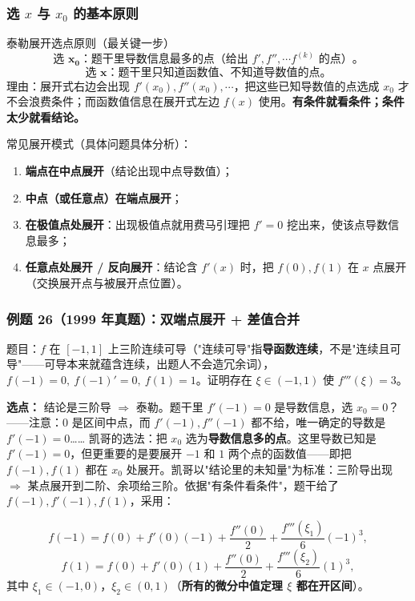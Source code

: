 \documentclass[a4paper]{article}
\begin{document}
\subsubsection{选 $x$ 与 $x_0$ 的基本原则}

\begin{importantbox}{泰勒展开选点原则（最关键一步）}
\[
\text{选 }\boldsymbol{x_0}\text{：题干里}\textbf{导数信息最多}\text{的点（给出 }f',f'',\cdots f^{(k)}\text{ 的点）}。
\]
\[
\text{选 }\boldsymbol{x}\text{：题干里}\textbf{只知道函数值、不知道导数值}\text{的点}。
\]
理由：展开式右边会出现 $f'(x_0),f''(x_0),\cdots$，把这些已知导数值的点选成 $x_0$ 才不会浪费条件；而函数值信息在展开式左边 $f(x)$ 使用。\textbf{有条件就看条件；条件太少就看结论。}
\end{importantbox}

常见展开模式（具体问题具体分析）：
\begin{enumerate}
\item \textbf{端点在中点展开}（结论出现中点导数值）；
\item \textbf{中点（或任意点）在端点展开}；
\item \textbf{在极值点处展开}：出现极值点就用费马引理把 $f'=0$ 挖出来，使该点导数信息最多；
\item \textbf{任意点处展开 / 反向展开}：结论含 $f'(x)$ 时，把 $f(0),f(1)$ 在 $x$ 点展开（交换展开点与被展开点位置）。
\end{enumerate}

\subsubsection{例题 26（1999 年真题）：双端点展开 + 差值合并}

题目：$f$ 在 $[-1,1]$ 上三阶连续可导（"连续可导"指\textbf{导函数连续}，不是"连续且可导"——可导本来就蕴含连续，出题人不会造冗余词），$f(-1)=0,\ f(-1)'=0,\ f(1)=1$。证明存在 $\xi\in(-1,1)$ 使 $f'''(\xi)=3$。

\textbf{选点：} 结论是三阶导 $\Rightarrow$ 泰勒。题干里 $f'(-1)=0$ 是导数信息，选 $x_0=0$？——注意：0 是区间中点，而 $f'(-1),f''(-1)$ 都不给，唯一确定的导数是 $f'(-1)=0$…… 凯哥的选法：把 $x_0$ 选为\textbf{导数信息多的点}。这里导数已知是 $f'(-1)=0$，但更重要的是要展开 $-1$ 和 $1$ 两个点的函数值——即把 $f(-1),f(1)$ 都在 $x_0$ 处展开。凯哥以"结论里的未知量"为标准：三阶导出现 $\Rightarrow$ 某点展开到二阶、余项给三阶。依据"有条件看条件"，题干给了 $f(-1),f'(-1),f(1)$，采用：

\[
f(-1)=f(0)+f'(0)(-1)+\frac{f''(0)}{2}+\frac{f'''(\xi_1)}{6}(-1)^3,
\]
\[
f(1)=f(0)+f'(0)(1)+\frac{f''(0)}{2}+\frac{f'''(\xi_2)}{6}(1)^3,
\]
其中 $\xi_1\in(-1,0)$，$\xi_2\in(0,1)$（\textbf{所有的微分中值定理 $\xi$ 都在开区间}）。
\end{document}
